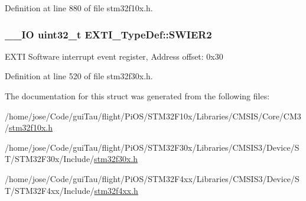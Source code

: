 Definition at line 880 of file stm32f10x.\-h.

\hypertarget{struct_e_x_t_i___type_def_ac537696dafad0997c5ebc4f4d21abd16}{
\subsubsection[{S\-W\-I\-E\-R2}]{\setlength{\rightskip}{0pt plus 5cm}\-\_\-\-\_\-\-I\-O {\bf uint32\-\_\-t} E\-X\-T\-I\-\_\-\-Type\-Def\-::\-S\-W\-I\-E\-R2}}\label{struct_e_x_t_i___type_def_ac537696dafad0997c5ebc4f4d21abd16}
E\-X\-T\-I Software interrupt event register, Address offset\-: 0x30 

Definition at line 520 of file stm32f30x.\-h.



The documentation for this struct was generated from the following files\-:\begin{DoxyCompactItemize}
\item 
/home/jose/\-Code/gui\-Tau/flight/\-Pi\-O\-S/\-S\-T\-M32\-F10x/\-Libraries/\-C\-M\-S\-I\-S/\-Core/\-C\-M3/\hyperlink{stm32f10x_8h}{stm32f10x.\-h}\item 
/home/jose/\-Code/gui\-Tau/flight/\-Pi\-O\-S/\-S\-T\-M32\-F30x/\-Libraries/\-C\-M\-S\-I\-S3/\-Device/\-S\-T/\-S\-T\-M32\-F30x/\-Include/\hyperlink{stm32f30x_8h}{stm32f30x.\-h}\item 
/home/jose/\-Code/gui\-Tau/flight/\-Pi\-O\-S/\-S\-T\-M32\-F4xx/\-Libraries/\-C\-M\-S\-I\-S3/\-Device/\-S\-T/\-S\-T\-M32\-F4xx/\-Include/\hyperlink{stm32f4xx_8h}{stm32f4xx.\-h}\end{DoxyCompactItemize}
